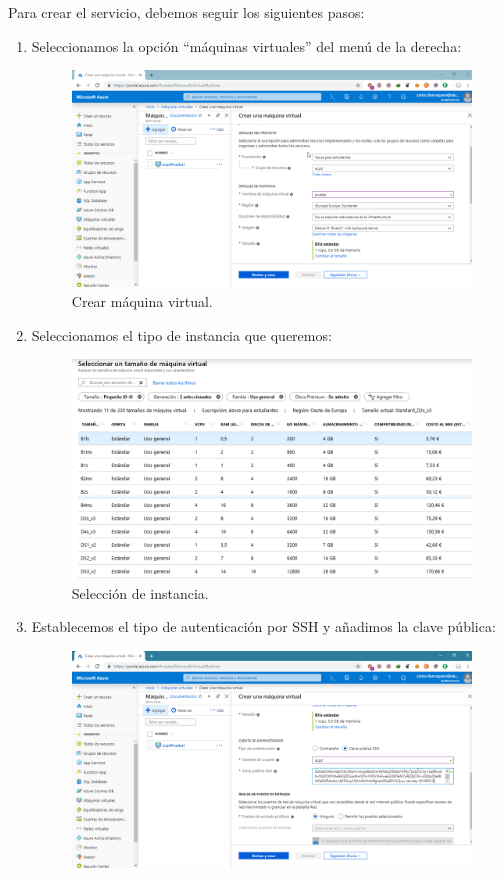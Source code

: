 Para crear el servicio, debemos seguir los siguientes pasos:
\begin{enumerate}
	\item Seleccionamos la opción ``máquinas virtuales'' del menú de la derecha:
	\begin{figure}[h]
		\centering
		\includegraphics[scale=0.35]{ImagenesAzure/1.png}
		\caption{Crear máquina virtual.}
		\label{Crear máquina virtual}
	\end{figure}
\newpage
	\item Seleccionamos el tipo de instancia que queremos:
	\begin{figure}[h]
		\centering
		\includegraphics[scale=0.35]{ImagenesAzure/1medio.png}
		\caption{Selección de instancia.}
		\label{Selección de instancia2}
	\end{figure}
	\item Establecemos el tipo de autenticación por SSH y añadimos la clave pública:
	\begin{figure}[h]
		\centering
		\includegraphics[scale=0.35]{ImagenesAzure/2.png}

\end{figure}
\end{enumerate}
